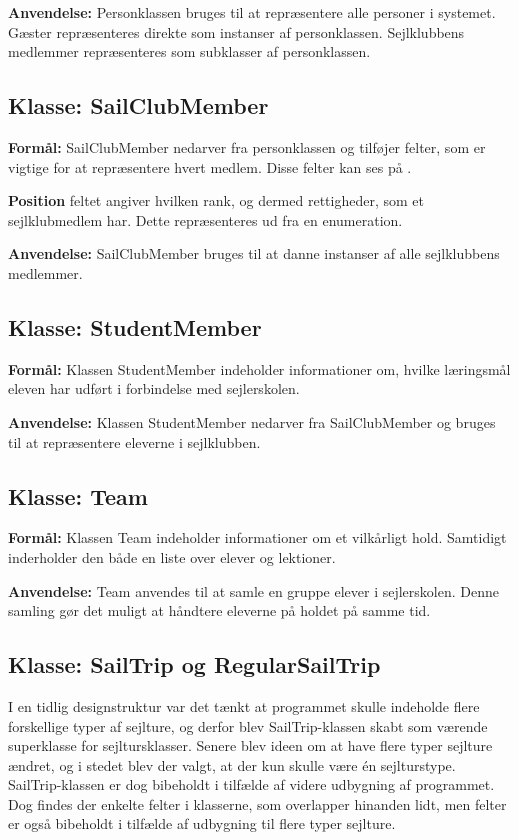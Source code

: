 \textbf{Anvendelse:}
Personklassen bruges til at repræsentere alle personer i systemet. 
Gæster repræsenteres direkte som instanser af personklassen. 
Sejlklubbens medlemmer repræsenteres som subklasser af personklassen. 

\subsection*{Klasse: SailClubMember}

\textbf{Formål:}
SailClubMember nedarver fra personklassen og tilføjer felter, som er vigtige for at repræsentere hvert medlem.
Disse felter kan ses på .

\textbf{Position} feltet angiver hvilken rank, og dermed rettigheder, som et sejlklubmedlem har. 
Dette repræsenteres ud fra en enumeration.

\textbf{Anvendelse:}
SailClubMember bruges til at danne instanser af alle sejlklubbens medlemmer. 

\subsection*{Klasse: StudentMember}
\textbf{Formål:}
Klassen StudentMember indeholder informationer om, hvilke læringsmål eleven har udført i forbindelse med sejlerskolen. 

\textbf{Anvendelse:}
Klassen StudentMember nedarver fra SailClubMember og bruges til at repræsentere eleverne i sejlklubben.

\subsection*{Klasse: Team}

\textbf{Formål:}
Klassen Team indeholder informationer om et vilkårligt hold. 
Samtidigt inderholder den både en liste over elever og lektioner.

\textbf{Anvendelse:}
Team anvendes til at samle en gruppe elever i sejlerskolen.
Denne samling gør det muligt at håndtere eleverne på holdet på samme tid.

\subsection*{Klasse: SailTrip og RegularSailTrip}

I en tidlig designstruktur var det tænkt at programmet skulle indeholde flere forskellige typer af sejlture, og derfor blev SailTrip-klassen skabt som værende superklasse for sejltursklasser. 
Senere blev ideen om at have flere typer sejlture ændret, og i stedet blev der valgt, at der kun skulle være én sejlturstype. 
SailTrip-klassen er dog bibeholdt i tilfælde af videre udbygning af programmet.
Dog findes der enkelte felter i klasserne, som overlapper hinanden lidt, men felter er også bibeholdt i tilfælde af udbygning til flere typer sejlture.

